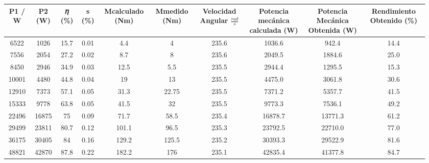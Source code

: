 \documentclass[12pt]{article}
\begin{document}
{\extrarowheight
\renewcommand{\arraystretch}{2.25}
    \begin{table}[H]
        \centering
        \begin{tabular}{cccccccccc}
        P1 / W & P2 (W) & 𝜂 (\%) & s (\%) & Mcalculado (Nm) & Mmedido (Nm) & Velocidad Angular $\frac{rad}{s}$ & Potencia mecánica calculada (W) & Potencia Mecánica Obtenida (W) & Rendimiento Obtenido (\%) \\ \hline
        6522   & 1026   & 15.7    & 0.01   & 4.4             & 4            & 235.6             & 1036.6                      & 942.4                      & 14.4                 \\
        7556   & 2054   & 27.2    & 0.02   & 8.7             & 8            & 235.6             & 2049.5                      & 1884.6                     & 25.0                 \\
        8450   & 2946   & 34.9    & 0.03   & 12.5            & 5.5          & 235.5             & 2944.4                      & 1295.5                     & 15.3                 \\
        10001  & 4480   & 44.8    & 0.04   & 19              & 13           & 235.5             & 4475.0                      & 3061.8                     & 30.6                 \\
        12910  & 7373   & 57.1    & 0.05   & 31.3            & 22.75        & 235.5             & 7371.2                      & 5357.7                     & 41.5                 \\
        15333  & 9778   & 63.8    & 0.05   & 41.5            & 32           & 235.5             & 9773.3                      & 7536.1                     & 49.2                 \\
        22496  & 16875  & 75      & 0.09   & 71.7            & 58.5         & 235.4             & 16878.7                     & 13771.3                    & 61.2                 \\
        29499  & 23811  & 80.7    & 0.12   & 101.1           & 96.5         & 235.3             & 23792.5                     & 22710.0                    & 77.0                 \\
        36175  & 30405  & 84      & 0.16   & 129.2           & 125.5        & 235.2             & 30393.3                     & 29522.9                    & 81.6                 \\
        48821  & 42870  & 87.8    & 0.22   & 182.2           & 176          & 235.1             & 42835.4                     & 41377.8                    & 84.7                 \\

\end{tabular}
\end{table}}
\end{document}
